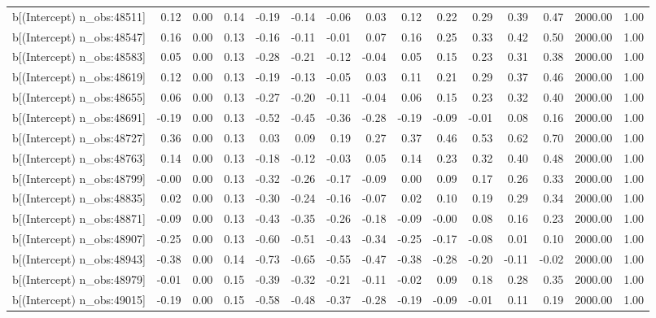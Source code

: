 \begin{table}[ht]
\begin{tabular}{rrrrrrrrrrrrrrr}
  b[(Intercept) n\_obs:48511] & 0.12 & 0.00 & 0.14 & -0.19 & -0.14 & -0.06 & 0.03 & 0.12 & 0.22 & 0.29 & 0.39 & 0.47 & 2000.00 & 1.00 \\ 
  b[(Intercept) n\_obs:48547] & 0.16 & 0.00 & 0.13 & -0.16 & -0.11 & -0.01 & 0.07 & 0.16 & 0.25 & 0.33 & 0.42 & 0.50 & 2000.00 & 1.00 \\ 
  b[(Intercept) n\_obs:48583] & 0.05 & 0.00 & 0.13 & -0.28 & -0.21 & -0.12 & -0.04 & 0.05 & 0.15 & 0.23 & 0.31 & 0.38 & 2000.00 & 1.00 \\ 
  b[(Intercept) n\_obs:48619] & 0.12 & 0.00 & 0.13 & -0.19 & -0.13 & -0.05 & 0.03 & 0.11 & 0.21 & 0.29 & 0.37 & 0.46 & 2000.00 & 1.00 \\ 
  b[(Intercept) n\_obs:48655] & 0.06 & 0.00 & 0.13 & -0.27 & -0.20 & -0.11 & -0.04 & 0.06 & 0.15 & 0.23 & 0.32 & 0.40 & 2000.00 & 1.00 \\ 
  b[(Intercept) n\_obs:48691] & -0.19 & 0.00 & 0.13 & -0.52 & -0.45 & -0.36 & -0.28 & -0.19 & -0.09 & -0.01 & 0.08 & 0.16 & 2000.00 & 1.00 \\ 
  b[(Intercept) n\_obs:48727] & 0.36 & 0.00 & 0.13 & 0.03 & 0.09 & 0.19 & 0.27 & 0.37 & 0.46 & 0.53 & 0.62 & 0.70 & 2000.00 & 1.00 \\ 
  b[(Intercept) n\_obs:48763] & 0.14 & 0.00 & 0.13 & -0.18 & -0.12 & -0.03 & 0.05 & 0.14 & 0.23 & 0.32 & 0.40 & 0.48 & 2000.00 & 1.00 \\ 
  b[(Intercept) n\_obs:48799] & -0.00 & 0.00 & 0.13 & -0.32 & -0.26 & -0.17 & -0.09 & 0.00 & 0.09 & 0.17 & 0.26 & 0.33 & 2000.00 & 1.00 \\ 
  b[(Intercept) n\_obs:48835] & 0.02 & 0.00 & 0.13 & -0.30 & -0.24 & -0.16 & -0.07 & 0.02 & 0.10 & 0.19 & 0.29 & 0.34 & 2000.00 & 1.00 \\ 
  b[(Intercept) n\_obs:48871] & -0.09 & 0.00 & 0.13 & -0.43 & -0.35 & -0.26 & -0.18 & -0.09 & -0.00 & 0.08 & 0.16 & 0.23 & 2000.00 & 1.00 \\ 
  b[(Intercept) n\_obs:48907] & -0.25 & 0.00 & 0.13 & -0.60 & -0.51 & -0.43 & -0.34 & -0.25 & -0.17 & -0.08 & 0.01 & 0.10 & 2000.00 & 1.00 \\ 
  b[(Intercept) n\_obs:48943] & -0.38 & 0.00 & 0.14 & -0.73 & -0.65 & -0.55 & -0.47 & -0.38 & -0.28 & -0.20 & -0.11 & -0.02 & 2000.00 & 1.00 \\ 
  b[(Intercept) n\_obs:48979] & -0.01 & 0.00 & 0.15 & -0.39 & -0.32 & -0.21 & -0.11 & -0.02 & 0.09 & 0.18 & 0.28 & 0.35 & 2000.00 & 1.00 \\ 
  b[(Intercept) n\_obs:49015] & -0.19 & 0.00 & 0.15 & -0.58 & -0.48 & -0.37 & -0.28 & -0.19 & -0.09 & -0.01 & 0.11 & 0.19 & 2000.00 & 1.00 \\ 

\end{tabular}
\end{table}
